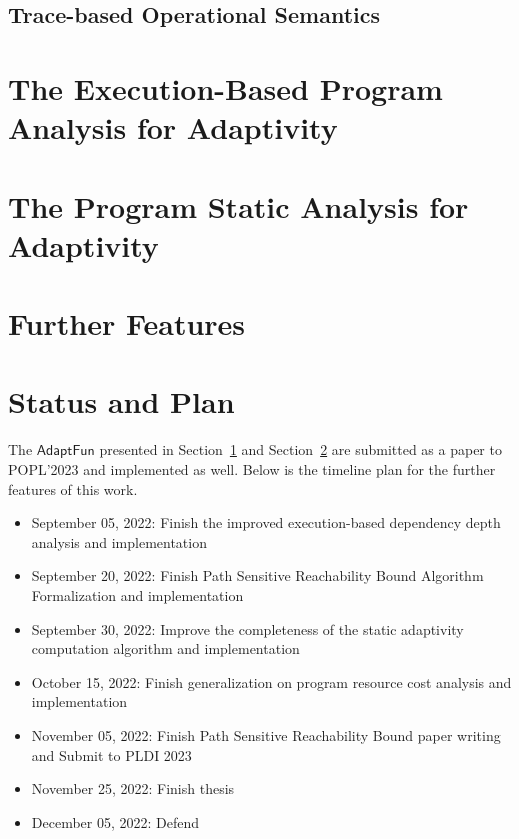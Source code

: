 \documentclass[a4paper,11pt]{article}
\newcommand{\THESYSTEM}{\textsf{AdaptFun}}
\begin{document}


\subsection{Trace-based Operational Semantics}
\label{sec:language-os}

% 
\cleardoublepage

\section{The Execution-Based Program Analysis for Adaptivity}
\label{sec:dynamic}


\section{The Program Static Analysis for Adaptivity}
\label{sec:static}

\cleardoublepage


\section{Further Features}
\label{sec:furthers}


% 

% 

\section{Status and Plan}
The $\THESYSTEM$ presented in Section~\ref{sec:dynamic} and Section~\ref{sec:static} are submitted as a paper to POPL'2023 and implemented as well. Below is the timeline plan for the further features of this work.
\begin{itemize}
\item September 05, 2022: Finish the improved execution-based dependency depth analysis and implementation
\item September 20, 2022: Finish Path Sensitive Reachability Bound Algorithm Formalization and implementation
\item September 30, 2022: Improve the completeness of the static adaptivity computation algorithm and implementation
\item October 15, 2022:  Finish generalization on program resource cost analysis and implementation
\item November 05, 2022: Finish Path Sensitive Reachability Bound paper writing and Submit to PLDI 2023
\item November 25, 2022: Finish thesis
\item December 05, 2022: Defend
\end{itemize}




\end{document}
